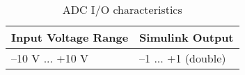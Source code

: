\begin{table}[H]
    \centering
        \begin{tabularx}{0.6\textwidth}{ 
        | >{\raggedright\arraybackslash}X 
        | >{\raggedright\arraybackslash}X |}
        \hline
        \rowcolor[HTML]{34CDF9}\textbf{Input Voltage Range} & \textbf{Simulink Output} \\
        \hline
        –10 V ... +10 V  & –1 ... +1 (double) \\
        \hline
        \end{tabularx}
    \caption{ADC I/O characteristics}
    \label{ADC I/O characteristics}
\end{table}